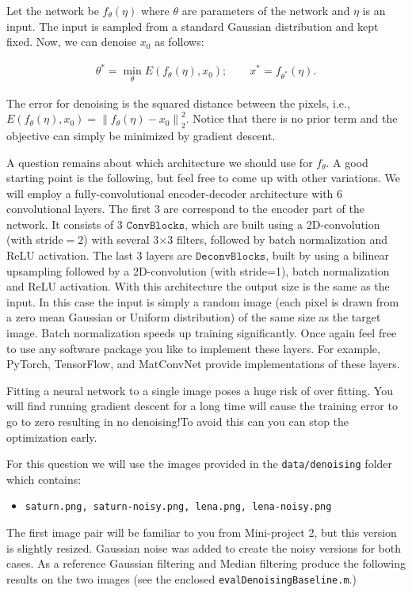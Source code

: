 \documentclass[10pt,letterpaper]{article}
\newcommand{\cmd}[1] {{\color{blue}\texttt{#1}}}
\newcommand{\norm}[1]{\left\lVert#1\right\rVert} %
\begin{document}
Let the network be $f_\theta(\eta)$ where $\theta$ are parameters of the network and $\eta$ is an  input. The input is sampled from a standard Gaussian distribution and kept fixed.
Now, we can denoise $x_0$ as follows:

\begin{align}
\label{eq:dip}
\theta^* = \min_\theta E(f_\theta(\eta), x_0); \qquad x^* = f_{\theta^*}(\eta).
\end{align}

The error for denoising is the squared distance between the pixels, i.e., $ E(f_\theta(\eta), x_0) = \norm{f_\theta(\eta) - x_0}_2^2$.
Notice that there is no prior term and the objective can simply be minimized by gradient descent.


A question remains about which architecture we should use for $f_\theta$.
A good starting point is the following, but feel free to come up with other variations.
We will employ a fully-convolutional encoder-decoder architecture with 6 convolutional layers.
The first 3 are correspond to the encoder part of the network.
It consists of 3 $\texttt{ConvBlocks}$, which are built using a 2D-convolution (with stride$=2$) with several 3$\times$3 filters, followed by batch normalization and ReLU activation.
The last 3 layers are $\texttt{DeconvBlocks}$, built by using a bilinear upsampling followed by a 2D-convolution (with stride=1), batch normalization and ReLU activation.
With this architecture the output size is the same as the input. In this case the input is simply a random image (each pixel is drawn from a zero mean Gaussian or Uniform distribution) of the same size as the target image.
Batch normalization speeds up training significantly.
Once again feel free to use any software package you like to implement these layers. For example, PyTorch, TensorFlow, and MatConvNet provide implementations of these layers.


Fitting a neural network to a single image poses a huge risk of over fitting. You will find running gradient descent for a long time will cause the training error to go to zero resulting in no denoising!To avoid this can you can stop the optimization early. 

For this question we will use the images provided in the \cmd{data/denoising} folder which contains:
\begin{itemize}
\item \texttt{saturn.png, saturn-noisy.png, lena.png, lena-noisy.png}
\end{itemize}
The first image pair will be familiar to you from Mini-project 2, but this version is slightly resized.
Gaussian noise was added to create the noisy versions for both cases.
As a reference Gaussian filtering and Median filtering produce the following results on the two images (see the enclosed \cmd{evalDenoisingBaseline.m}.)
\end{document}
